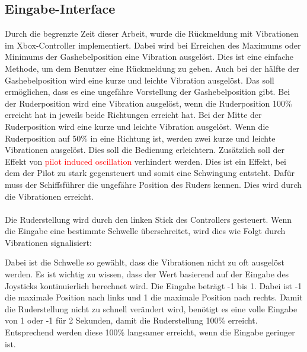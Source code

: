 \subsection{Eingabe-Interface}
Durch die begrenzte Zeit dieser Arbeit, wurde die Rückmeldung mit Vibrationen im Xbox-Controller implementiert.
Dabei wird bei Erreichen des Maximums oder Minimums der Gashebelposition eine Vibration ausgelöst. Dies ist eine einfache
Methode, um dem Benutzer eine Rückmeldung zu geben. Auch bei der hälfte der Gashebelposition wird eine kurze und leichte 
Vibration ausgelöst. Das soll ermöglichen, dass es eine ungefähre Vorstellung der Gashebelposition gibt.
Bei der Ruderposition wird eine Vibration ausgelöst, wenn die Ruderposition 100\% erreicht hat in jeweils beide Richtungen
erreicht hat. Bei der Mitte der Ruderposition wird eine kurze und leichte Vibration ausgelöst. Wenn die 
Ruderposition auf 50\% in eine Richtung ist, werden zwei kurze und leichte Vibrationen ausgelöst. Dies soll die Bedienung
erleichtern. Zusätzlich soll der Effekt von \textcolor{red}{pilot induced oscillation} verhindert werden. Dies ist ein Effekt,
bei dem der Pilot zu stark gegensteuert und somit eine Schwingung entsteht. Dafür muss der Schiffsführer 
die ungefähre Position des Ruders kennen. Dies wird durch die Vibrationen erreicht.\\
\\
Die Ruderstellung wird durch den linken Stick des Controllers gesteuert. Wenn die Eingabe eine bestimmte Schwelle überschreitet,
wird dies wie Folgt durch Vibrationen signalisiert:
\begin{figure}[h!]
    \centering
\end{figure}
Dabei ist die Schwelle so gewählt, dass die Vibrationen nicht zu oft ausgelöst werden. 
Es ist wichtig zu wissen, dass der Wert basierend auf der Eingabe des Joysticks kontinuierlich berechnet wird.
Die Eingabe beträgt -1 bis 1. Dabei ist -1 die maximale Position nach links und 1 die maximale Position nach rechts.
Damit die Ruderstellung nicht zu schnell verändert wird, benötigt es eine volle Eingabe von 1 oder -1 für 2 Sekunden,
damit die Ruderstellung 100\% erreicht. Entsprechend werden diese 100\% langsamer erreicht, wenn die Eingabe geringer
ist.
